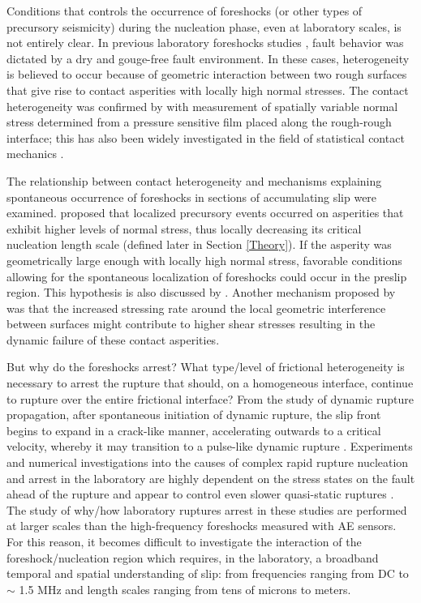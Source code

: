 \documentclass[preprint,1p, 10pt,authoryear]{elsarticle}
\begin{document}
Conditions that controls the occurrence of foreshocks (or other types of precursory seismicity) during the nucleation phase, even at laboratory scales, is not entirely clear. In previous laboratory foreshocks studies \citep{McLaskey2013, Selvadurai2015}, fault behavior was dictated by a dry and gouge-free fault environment.  In these cases, heterogeneity is believed to occur because of geometric interaction between two rough surfaces that give rise to contact asperities with locally high normal stresses.  The contact heterogeneity was confirmed by \citet{Selvadurai2017} with measurement of spatially variable normal stress determined from a pressure sensitive film placed along the rough-rough interface; this has also been widely investigated in the field of statistical contact mechanics \citep[e.g.][]{Greenwood1966,Johnson1985, Persson2006}. 

The relationship between contact heterogeneity and mechanisms explaining spontaneous occurrence of foreshocks in sections of accumulating slip were examined. \citet{Selvadurai2017} proposed that localized precursory events occurred on asperities that exhibit higher levels of normal stress, thus locally decreasing its critical nucleation length scale (defined later in Section \ref{Theory}). If the asperity was geometrically large enough with locally high normal stress, favorable conditions allowing for the spontaneous localization of foreshocks could occur in the preslip region. This hypothesis is also discussed by \citet{McLaskey2019}. Another mechanism proposed by \citet{McLaskey2013} was that the increased stressing rate around the local geometric interference between surfaces might contribute to higher shear stresses resulting in the dynamic failure of these contact asperities.  

But why do the foreshocks arrest? What type/level of frictional heterogeneity is necessary to arrest the rupture that should, on a homogeneous interface, continue to rupture over the entire frictional interface? From the study of dynamic rupture propagation, after spontaneous initiation of dynamic rupture, the slip front begins to expand in a crack-like manner, accelerating outwards to a critical velocity, whereby it may transition to a pulse-like dynamic rupture \citep{Heaton1990, Meier2016}. Experiments and numerical investigations into the causes of complex rapid rupture nucleation and arrest in the laboratory are highly dependent on the stress states on the fault ahead of the rupture \citep{Rubinstein2004, Rubinstein2006, Ben-David2010,Svetlizky2014,Fineberg2015, Maegawa2010, Tromborg2011, Kammer2012, Gabriel2012, Kammer2015} and appear to control even slower quasi-static ruptures \citep{Selvadurai2017a}. The study of why/how laboratory ruptures arrest in these studies are performed at larger scales than the high-frequency foreshocks measured with AE sensors. For this reason, it becomes difficult to investigate the interaction of the foreshock/nucleation region which requires, in the laboratory, a broadband temporal and spatial understanding of slip: from frequencies ranging from DC to $\sim$ 1.5 MHz and length scales ranging from tens of microns to meters. 
\end{document}
